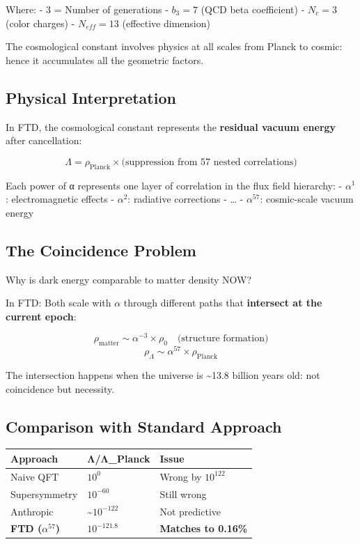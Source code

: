 \documentclass[
  11pt,
  letterpaper,
  twoside,
  openright]{book}
\begin{document}
Where: - 3 = Number of generations - \(b_3 = 7\) (QCD beta coefficient)
- \(N_c = 3\) (color charges) - \(N_{eff} = 13\) (effective dimension)

The cosmological constant involves physics at all scales from Planck to
cosmic: hence it accumulates all the geometric factors.

\subsection{Physical Interpretation}\label{physical-interpretation}

In FTD, the cosmological constant represents the \textbf{residual vacuum
energy} after cancellation:

\[\Lambda = \rho_{\text{Planck}} \times \text{(suppression from 57 nested correlations)}\]

Each power of α represents one layer of correlation in the flux field
hierarchy: - \(\alpha^1\): electromagnetic effects - \(\alpha^2\):
radiative corrections - \ldots{} - \(\alpha^{57}\): cosmic-scale vacuum
energy

\subsection{The Coincidence Problem}\label{the-coincidence-problem}

Why is dark energy comparable to matter density NOW?

In FTD: Both scale with \(\alpha\) through different paths that
\textbf{intersect at the current epoch}:

\[\rho_{\text{matter}} \sim \alpha^{-3} \times \rho_0 \quad \text{(structure formation)}\]
\[\rho_\Lambda \sim \alpha^{57} \times \rho_{\text{Planck}}\]

The intersection happens when the universe is \textasciitilde13.8
billion years old: not coincidence but necessity.

\subsection{Comparison with Standard
Approach}\label{comparison-with-standard-approach}

\begin{longtable}[]{@{}lll@{}}
\toprule\noalign{}
Approach & Λ/Λ\_Planck & Issue \\
\midrule\noalign{}
\endhead
\bottomrule\noalign{}
\endlastfoot
Naive QFT & \(10^0\) & Wrong by \(10^{122}\) \\
Supersymmetry & \(10^{-60}\) & Still wrong \\
Anthropic & \textasciitilde{}\(10^{-122}\) & Not predictive \\
\textbf{FTD (\(\alpha^{57}\))} & \textbf{\(10^{-121.8}\)} &
\textbf{Matches to 0.16\%} \\
\end{longtable}
\end{document}
